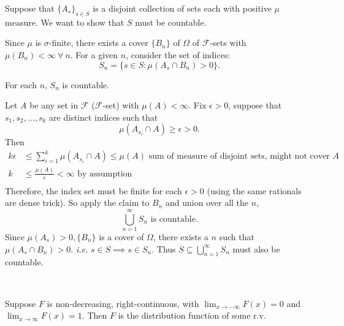 \documentclass[class=article,crop=false]{standalone}
\begin{document}
\begin{prf}
Suppose that $ \{A_s\}_{s \in S} $ is a disjoint collection of sets each with positive $ \mu$ measure. We want to show that $ S$ must be countable. 

Since $ \mu$ is $\sigma$-finite, there exists a cover $ \{B_n\} $ of $ \Omega$ of $ \mathcal{F}$-sets with $ \mu(B_n)< \infty \ \forall \ n$. For a given $ n$, consider the set of indices:
 \[
	 S_n = \{s \in S: \mu(A_s \cap B_n)>0\} 
.\] 
\begin{claim}[]
For each $ n$,  $ S_n$ is countable.
\end{claim}
Let $ A$ be any set in  $ \mathcal{F}$ ($ \mathcal{F}$-set) with $ \mu(A) < \infty$. Fix $ \epsilon>0$, suppose that $ s_1,s_2,\ldots,s_k$ are distinct indices such that 
\[
	\mu(A_{s_i} \cap A) \geq \epsilon > 0
.\]
Then
\begin{align*}
	k \epsilon &\leq \sum_{ i= 1}^{ k} \mu(A_{s_i} \cap A) \leq \mu(A) \text{ sum of measure of disjoint sets, might not cover }A \\
	k&\leq \frac{\mu(A)}{ \epsilon} < \infty \text{ by assumption}\\ 
\end{align*}
Therefore, the index set must be finite for each $ \epsilon>0$ (using the same rationals are dense trick). So apply the claim to $ B_n$ and union over all the $ n$,
\[
\bigcup_{ n= 1}^{ \infty} S_n \text{ is countable} 
.\] 
Since $ \mu(A_s)>0, \{B_n\} $ is a cover of $ \Omega$, there exists a $ n$  such that  $ \mu(A_s \cap B_n)>0$. \emph{i.e.} $ s \in S \implies s \in S_n$. Thus $ S \subseteq \bigcup_{ n =1}^{\infty} S_n$ must also be countable.
\end{prf}

~\begin{thm}[14.1]
	Suppose $ F$ is non-decreasing, right-continuous, with  $ \lim_{ x \to -\infty} F(x)=0$ and $ \lim_{ x \to \infty} F(x)=1$. Then $ F$ is the distribution function of some r.v.
\end{thm}
\end{document}

